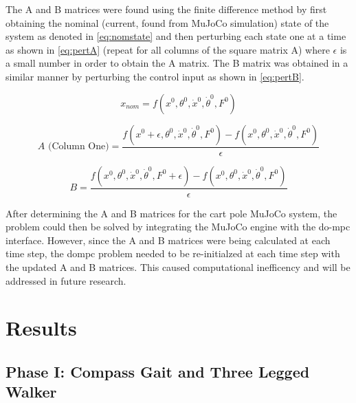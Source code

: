 \documentclass{./springer/svjour3}
\begin{document}
The A and B matrices were found using the finite difference method by first obtaining the nominal (current, found from MuJoCo simulation)
state of the system as denoted in \ref{eq:nomstate}
and then perturbing each state one at a time as shown in \ref{eq:pertA} (repeat for all columns of the square matrix A) where $\epsilon$
is a small number in order to obtain the A matrix. The B matrix was 
obtained in a similar manner by perturbing the control input as shown in \ref{eq:pertB}.

\begin{equation}
  x_{nom} = f(x^0, \theta^0, \dot{x}^0, \dot{\theta}^0, F^0)
  \label{eq:nomstate}
\end{equation}

\begin{equation}
  A \text{ (Column One)} =\frac{ f(x^0 + \epsilon, \theta^0, \dot{x}^0, \dot{\theta}^0, F^0) - f(x^0, \theta^0, \dot{x}^0, \dot{\theta}^0, F^0)}{\epsilon}
  \label{eq:pertA}
\end{equation}

\begin{equation}
  B =\frac{ f(x^0, \theta^0, \dot{x}^0, \dot{\theta}^0, F^0 + \epsilon) - f(x^0, \theta^0, \dot{x}^0, \dot{\theta}^0, F^0)}{\epsilon}
  \label{eq:pertB}
\end{equation}

After determining the A and B matrices for the cart pole MuJoCo system, the problem could then be solved by integrating the MuJoCo engine with the do-mpc interface.
However, since the A and B matrices were being calculated at each time step, the dompc problem needed to be re-initialzed at each time step with the updated A and B matrices.
This caused computational inefficency and will be addressed in future research.

\section{Results}

\subsection{Phase I: Compass Gait and Three Legged Walker}
\end{document}
